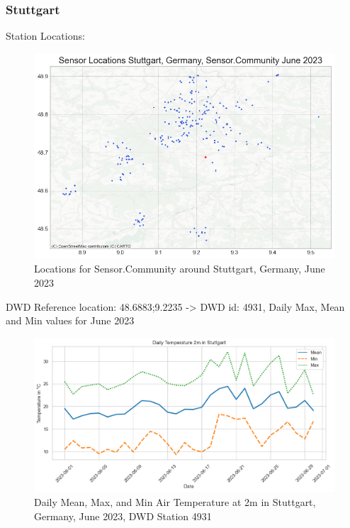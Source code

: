 \subsubsection{Stuttgart}

Station Locations:\\

\begin{figure}[ht]
    \centering
    \includegraphics[width=1\textwidth]{images/sensor_community_locations_stuttgart_after_qc_june_23.png}
    \caption{Locations for Sensor.Community around Stuttgart, Germany, June 2023}
\end{figure}

DWD Reference location: 48.6883;9.2235 -> DWD id: 4931, Daily Max, Mean and Min values for June 2023\\

\begin{figure}[ht]
    \centering
    \includegraphics[width=1\textwidth]{images/dwd_stuttgart_june_23_tair_max_mean_min.png}
    \caption{Daily Mean, Max, and Min Air Temperature at 2m in Stuttgart, Germany, June 2023, DWD Station 4931}
    \label{fig:dwd mean max min stuttgart june 23}
\end{figure}

